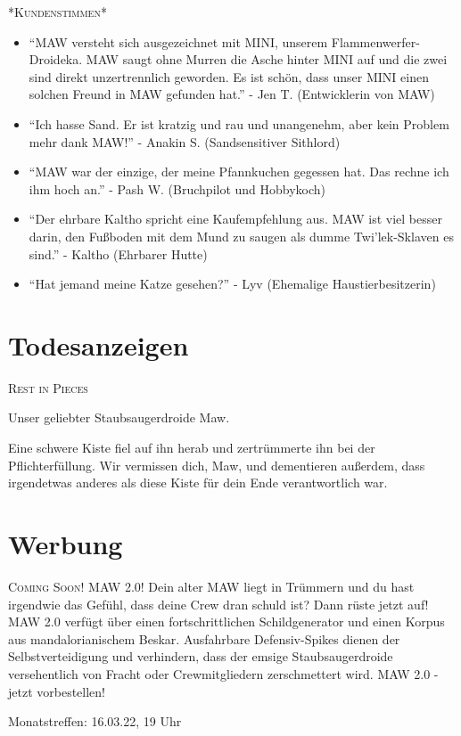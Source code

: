 \documentclass[final]{multiversum}
\begin{document}
\textsc{*Kundenstimmen*}
\begin{itemize}
\item \enquote{MAW versteht sich ausgezeichnet mit MINI, unserem Flammenwerfer-Droideka.
      MAW saugt ohne Murren die Asche hinter MINI auf und die zwei sind direkt unzertrennlich geworden. 
      Es ist schön, dass unser MINI einen solchen Freund in MAW gefunden hat.}
      - Jen T. (Entwicklerin von MAW)
\item \enquote{Ich hasse Sand. 
      Er ist kratzig und rau und unangenehm, aber kein Problem mehr dank MAW!}
      - Anakin S. (Sandsensitiver Sithlord)
\item \enquote{MAW war der einzige, der meine Pfannkuchen gegessen hat.
      Das rechne ich ihm hoch an.}
      - Pash W. (Bruchpilot und Hobbykoch)
\item \enquote{Der ehrbare Kaltho spricht eine Kaufempfehlung aus.
      MAW ist viel besser darin, den Fußboden mit dem Mund zu saugen als dumme Twi'lek-Sklaven es sind.}
      - Kaltho (Ehrbarer Hutte)
\item \enquote{Hat jemand meine Katze gesehen?}
      - Lyv (Ehemalige Haustierbesitzerin)
\end{itemize}

\section{Todesanzeigen}
\textsc{Rest in Pieces}
\begin{center}Unser geliebter Staubsaugerdroide Maw.\end{center} 
Eine schwere Kiste fiel auf ihn herab und zertrümmerte ihn bei der Pflichterfüllung.
Wir vermissen dich, Maw, und dementieren außerdem, dass irgendetwas anderes als diese Kiste für dein Ende verantwortlich war. 

\section{Werbung}
\textsc{Coming Soon! MAW 2.0!}
Dein alter MAW liegt in Trümmern und du hast irgendwie das Gefühl, dass deine Crew dran schuld ist? 
Dann rüste jetzt auf! MAW 2.0 verfügt über einen fortschrittlichen Schildgenerator und einen Korpus aus mandalorianischem Beskar. Ausfahrbare Defensiv-Spikes dienen der Selbstverteidigung und verhindern, dass der emsige Staubsaugerdroide versehentlich von Fracht oder Crewmitgliedern zerschmettert wird. 
MAW 2.0 - jetzt vorbestellen!


\begin{termine}
\item Monatstreffen: 16.03.22, 19 Uhr
\end{termine}
\impressum
\end{document}
